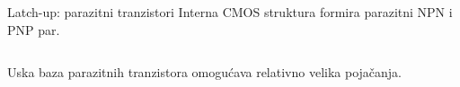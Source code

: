 \begin{frame}[label=09_2-s050]{Latch-up: parazitni tranzistori}
Interna CMOS struktura formira parazitni NPN i PNP par.\par\vspace{2mm}\begin{columns}[T,onlytextwidth]\centering {}\centering \end{columns}\par\vspace{2mm}\centering Uska baza parazitnih tranzistora omogućava relativno velika pojačanja.
\end{frame}
